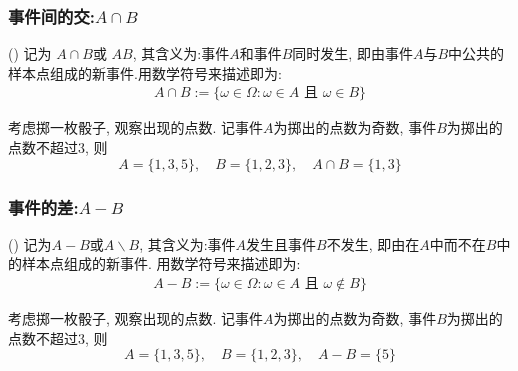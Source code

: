\begin{frame}
  \frametitle{事件间的交:$A\cap B$}

  \begin{defi} () 记为 $A\cap B$或 $AB$, 其含义为:事件$A$和事件$B$同时发生, 即由事件$A$与$B$中公共的样本点组成的新事件.\pause 用数学符号来描述即为:
    \begin{eqnarray*}
      A\cap B:=\{\omega\in \Omega: \omega\in A \mbox{ 且 } \omega\in B\}
    \end{eqnarray*}
  \end{defi}
  \vspace{-0.7cm}

  \pause
  \begin{exam}
    考虑掷一枚骰子, 观察出现的点数. 记事件$A$为掷出的点数为奇数, 事件$B$为掷出的点数不超过$3$, 则
    \[A=\{1,3,5\},\quad  B=\{1,2,3\},\quad  A\cap B=\{1,3\}\]

  \end{exam}

\end{frame}


\begin{frame}
  \frametitle{事件的差:$A-B$}

  \begin{defi} () 记为$A-B$或$A\backslash B$, 其含义为:事件$A$发生且事件$B$不发生, 即由在$A$中而不在$B$中的样本点组成的新事件. \pause 用数学符号来描述即为:
    \begin{eqnarray*}
      A-B:=\{\omega\in \Omega: \omega\in  A \mbox{ 且 } \omega\notin B\}
    \end{eqnarray*}
  \end{defi}
  \vspace{-0.7cm}

  \pause
  \begin{exam}
    考虑掷一枚骰子, 观察出现的点数. 记事件$A$为掷出的点数为奇数, 事件$B$为掷出的点数不超过$3$, 则
    \[A=\{1,3,5\},\quad  B=\{1,2,3\},\quad  A-B=\{5\}\]   \end{exam}

\end{frame}


